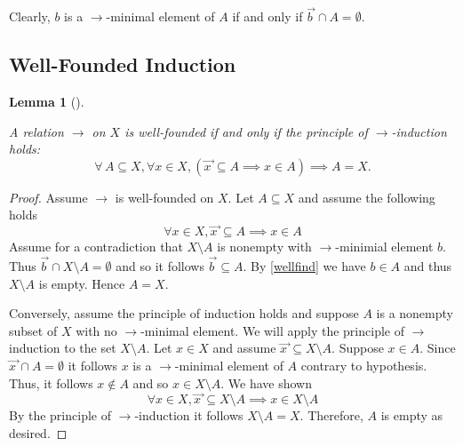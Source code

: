 \documentclass[
  letterpaper,
  10pt,
  reqno,
  twopage,
  openany]{book}
\theoremstyle{plain}
\newtheorem{lemma}{Lemma}[chapter]
\theoremstyle{definition}
\theoremstyle{definition}
\theoremstyle{definition}
\theoremstyle{plain}
\theoremstyle{plain}
\theoremstyle{remark}
\begin{document}
Clearly, \(b\) is a \(\longrightarrow\)-minimal element of \(A\) if and
only if \(\overrightarrow{b\,}\cap A=\emptyset.\)

\hypertarget{well-founded-induction}{%
\subsection{Well-Founded Induction}\label{well-founded-induction}}

\leavevmode{}%
\begin{lemma}[]\label{lem-well-founded-nduction}

A relation \(\longrightarrow\) on \(X\) is well-founded if and only if
the principle of \(\longrightarrow\)-induction holds: \[
\forall \, A\subseteq X, 
\forall x\in X, (\overrightarrow{x\,}\subseteq A \implies x\in A)
\implies  A=X.
\]

\end{lemma}

\begin{proof}

Assume \(\longrightarrow\) is well-founded on \(X.\) Let
\(A\subseteq X\) and assume the following holds \begin{equation}
\label{wellfind}
\forall x\in X, \overrightarrow{x\,}\subseteq A \implies x\in A
\end{equation} Assume for a contradiction that \(X\setminus A\) is
nonempty with \(\longrightarrow\)-minimial element \(b.\) Thus
\(\overrightarrow{b\,}\cap X\setminus A=\emptyset\) and so it follows
\(\overrightarrow{b\,}\subseteq A.\) By \eqref{wellfind} we have
\(b\in A\) and thus \(X\setminus A\) is empty. Hence \(A=X.\)

Conversely, assume the principle of induction holds and suppose \(A\) is
a nonempty subset of \(X\) with no \(\longrightarrow\)-minimal element.
We will apply the principle of \(\longrightarrow\) induction to the set
\(X\setminus A.\) Let \(x\in X\) and assume
\(\overrightarrow{x\,}\subseteq X\setminus A.\) Suppose \(x\in A.\)
Since \(\overrightarrow{x\,}\cap A=\emptyset\) it follows \(x\) is a
\(\longrightarrow\)-minimal element of \(A\) contrary to hypothesis.
Thus, it follows \(x\not\in A\) and so \(x\in X\setminus A.\) We have
shown \[
\forall x\in X, \overrightarrow{x\,}\subseteq X\setminus A \implies x\in X\setminus A
\] By the principle of \(\longrightarrow\)-induction it follows
\(X\setminus A=X.\) Therefore, \(A\) is empty as desired.

\end{proof}
\end{document}
